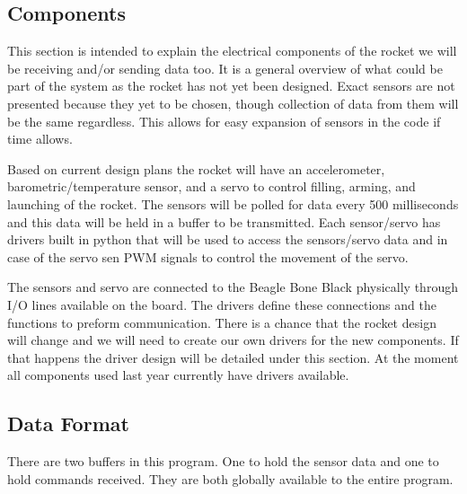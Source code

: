 \documentclass[10pt,draftclsnofoot,onecolumn,retainorgcmds]{IEEEtran}
\begin{document}
\subsection{Components} 
This section is intended to explain the electrical components of the rocket we will be receiving and/or sending data too. It is a general overview of what could be part of the system as the rocket has not yet been designed. Exact sensors are not presented because they yet to be chosen, though collection of data from them will be the same regardless. This allows for easy expansion of sensors in the code if time allows.\par
Based on current design plans the rocket will have an accelerometer, barometric/temperature sensor, and a servo to control filling, arming, and launching of the rocket. The sensors will be polled for data every 500 milliseconds and this data will be held in a buffer to be transmitted. Each sensor/servo has drivers built in python that will be used to access the sensors/servo data and in case of the servo sen PWM signals to control the movement of the servo.\par
The sensors and servo are connected to the Beagle Bone Black physically through I/O lines available on the board. The drivers define these connections and the functions to preform communication. There is a chance that the rocket design will change and we will need to create our own drivers for the new components. If that happens the driver design will be detailed under this section. At the moment all components used last year currently have drivers available.\par
\subsection{Data Format}
There are two buffers in this program. One to hold the sensor data and one to hold commands received. They are both globally available to the entire program.
\end{document}
